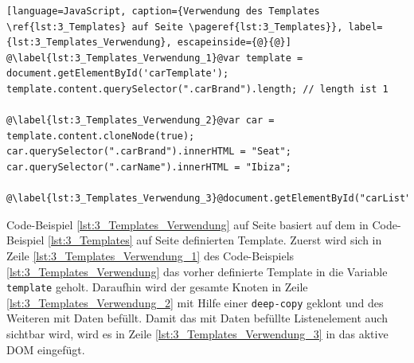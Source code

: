 \begin{lstlisting}[language=JavaScript, caption={Verwendung des Templates \ref{lst:3_Templates} auf Seite \pageref{lst:3_Templates}}, label={lst:3_Templates_Verwendung}, escapeinside={@}{@}]
@\label{lst:3_Templates_Verwendung_1}@var template = document.getElementById('carTemplate');
template.content.querySelector(".carBrand").length; // length ist 1

@\label{lst:3_Templates_Verwendung_2}@var car = template.content.cloneNode(true);
car.querySelector(".carBrand").innerHTML = "Seat";
car.querySelector(".carName").innerHTML = "Ibiza";

@\label{lst:3_Templates_Verwendung_3}@document.getElementById("carList").appendChild(car);
\end{lstlisting}
Code-Beispiel \ref{lst:3_Templates_Verwendung} auf Seite \pageref{lst:3_Templates_Verwendung} basiert auf dem in Code-Beispiel \ref{lst:3_Templates} auf Seite \pageref{lst:3_Templates} definierten Template. Zuerst wird sich in Zeile \ref{lst:3_Templates_Verwendung_1} des Code-Beispiels \ref{lst:3_Templates_Verwendung} das vorher definierte Template in die Variable \lstinline|template| geholt. Daraufhin wird der gesamte Knoten in Zeile \ref{lst:3_Templates_Verwendung_2} mit Hilfe einer \lstinline|deep-copy| geklont und des Weiteren mit Daten befüllt. Damit das mit Daten befüllte Listenelement auch sichtbar wird, wird es in Zeile \ref{lst:3_Templates_Verwendung_3} in das aktive DOM eingefügt.
